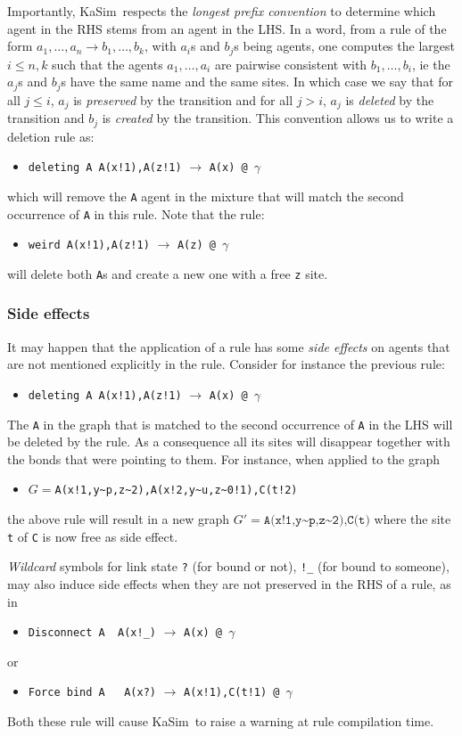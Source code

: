 \documentclass[11pt]{book}
\def\KaSim{\textsf{KaSim}}
\def\intstate{\textasciitilde}
\def\ttt#1{\texttt{#1}}
\def\rar{\rightarrow}
\def\ga{\gamma}
\def\ie{ie }
\def\ITE#1{\begin{itemize}#1\end{itemize}}
\begin{document}
Importantly, \KaSim~respects the \emph{longest prefix convention} to determine which agent in the RHS stems from an agent in the LHS. 
In a word, from a rule of the form $a_1,\dots,a_n\rar b_1,\dots,b_k$, with $a_i$s and $b_j$s being agents, one computes the largest $i\leq n,k$ such that the agents $a_1,\dots,a_i$ are pairwise consistent with $b_1,\dots,b_i$, \ie the $a_j$s and $b_j$s have the same name and the same sites. In which case we say that for all $j\leq i$, $a_j$ is \emph{preserved} by the transition and for all $j>i$, $a_j$ is \emph{deleted} by the transition and $b_j$ is \emph{created} by the transition. This convention allows us to write a deletion rule as:
\ITE{
\item[] \ttt{{\textquotesingle}deleting A\textquotesingle\  A(x!1),A(z!1)} $\rar$ \ttt{A(x) @ $\ga$} 
}
which will remove the \ttt{A} agent in the mixture that will match the second occurrence of \ttt{A} in this rule.
Note that the rule:
\ITE{
\item[] \ttt{{\textquotesingle}weird\textquotesingle\  A(x!1),A(z!1)} $\rar$ \ttt{A(z) @ $\ga$} 
}
will delete both \ttt{A}s and create a new one with a free \ttt{z} site.

\subsubsection*{Side effects}\label{sec:side-effect}

It may happen that the application of a rule has some \emph{side effects} on agents that are not mentioned explicitly in the rule. Consider for instance the previous rule:
\ITE{
\item[] \ttt{{\textquotesingle}deleting A{\textquotesingle} A(x!1),A(z!1)} $\rar$ \ttt{A(x) @ $\ga$} 
}
The \ttt{A} in the graph that is matched to the second occurrence of \ttt{A} in the LHS will be deleted by the rule. As a consequence all its sites will disappear together with the bonds that were pointing to them. For instance, when applied to the graph 
\ITE{
\item[] $G=$\ttt{A(x!1,y\intstate p,z\intstate2),A(x!2,y\intstate u,z\intstate0!1),C(t!2)}
} 
the above rule will result in a new graph $G' =\ttt{A(x!1,y{\intstate}p,z\intstate2),C(t)}$ where the site \ttt{t} of \ttt{C} is now free as side effect.

\emph{Wildcard} symbols for link state \ttt{?} (for bound or not), \ttt{!\_} (for bound to someone), may also induce side effects when they are not preserved in the RHS of a rule, as in
\ITE{
\item[] \ttt{{\textquotesingle}Disconnect A{\textquotesingle}~ A(x!\_)} $\rar$ \ttt{A(x) @ $\ga$} 
}
or 
\ITE{
\item[] \ttt{{\textquotesingle}Force bind A{\textquotesingle} ~ A(x?)} $\rar$ \ttt{A(x!1),C(t!1) @ $\ga$} 
}
Both these rule will cause \KaSim~to raise a warning at rule compilation time.
\end{document}
